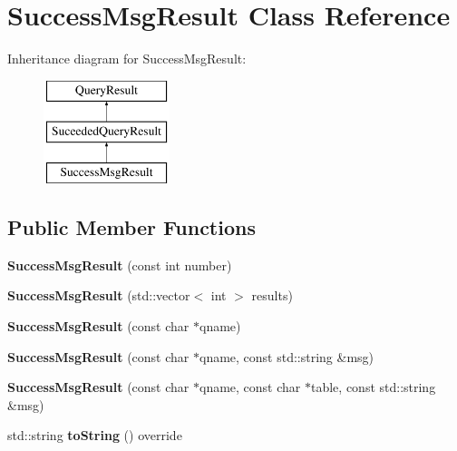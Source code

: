 \hypertarget{class_success_msg_result}{}\section{Success\+Msg\+Result Class Reference}
\label{class_success_msg_result}
Inheritance diagram for Success\+Msg\+Result\+:\begin{figure}[H]
\begin{center}
\leavevmode
\includegraphics[height=3.000000cm]{class_success_msg_result}
\end{center}
\end{figure}
\subsection*{Public Member Functions}
\begin{DoxyCompactItemize}
\item 
\mbox{\label{class_success_msg_result_a490473d12f70482f70ebb745862a3087}} 
{\bfseries Success\+Msg\+Result} (const int number)
\item 
\mbox{\label{class_success_msg_result_a56f5539bded5429768ea1b1b1071f43e}} 
{\bfseries Success\+Msg\+Result} (std\+::vector$<$ int $>$ results)
\item 
\mbox{\label{class_success_msg_result_a502962f16dde2cfc7615c4fcc5492d2a}} 
{\bfseries Success\+Msg\+Result} (const char $\ast$qname)
\item 
\mbox{\label{class_success_msg_result_ad64cc29af19b1bf721fb05e75190e0a1}} 
{\bfseries Success\+Msg\+Result} (const char $\ast$qname, const std\+::string \&msg)
\item 
\mbox{\label{class_success_msg_result_aad32ebfe1de7a579d1292fcc47295e07}} 
{\bfseries Success\+Msg\+Result} (const char $\ast$qname, const char $\ast$table, const std\+::string \&msg)
\item 
\mbox{\label{class_success_msg_result_a97af69dd704091d77dcf48ca726690e3}} 
std\+::string {\bfseries to\+String} () override
\end{DoxyCompactItemize}
